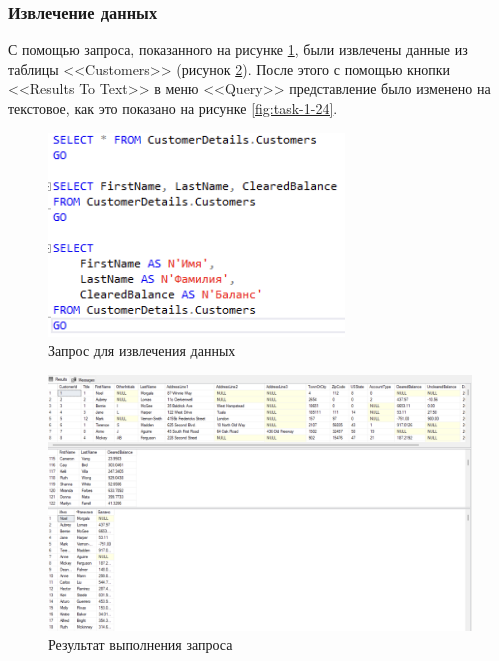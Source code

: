 \documentclass[a4paper, 14pt]{extarticle}
\begin{document}
\subsubsection{Извлечение данных}

С помощью запроса, показанного на рисунке \ref{fig:task-1-22}, были извлечены
данные из таблицы <<\foreignlanguage{english}{Customers}>> (рисунок
\ref{fig:task-1-23}). После этого с помощью кнопки
<<\foreignlanguage{english}{Results To Text}>> в меню
<<\foreignlanguage{english}{Query}>> представление было изменено на текстовое,
как это показано на рисунке \ref{fig:task-1-24}.

\begin{figure}[H]
  \centering
  \includegraphics[width=0.7\textwidth]{images/task-1/22.png}
  \caption{Запрос для извлечения данных}
  \label{fig:task-1-22}
\end{figure}

\begin{figure}[H]
  \centering
  \includegraphics[width=\textwidth]{images/task-1/23.png}
  \caption{Результат выполнения запроса}
  \label{fig:task-1-23}
\end{figure}
\end{document}
